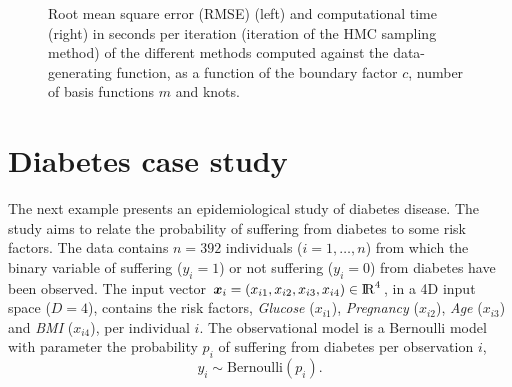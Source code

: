\documentclass[onecolumn,a4paper,11pt]{article}
\begin{document}
\begin{figure}
\caption{Root mean square error (RMSE) (left) and computational time (right) in seconds per iteration (iteration of the HMC sampling method) of the different methods computed against the data-generating function, as a function of the boundary factor $c$, number of basis functions $m$ and knots.}
  \label{ch5_fig17_RMSE_exII}
\end{figure}


\section{Diabetes case study}\label{ch5_sec_bf_caseV}
The next example presents an epidemiological study of diabetes disease. The study aims to relate the probability of suffering from diabetes to some risk factors. The data contains $n=392$ individuals ($i=1,\dots,n$) from which the binary variable of suffering ($y_i=1$) or not suffering ($y_i=0$) from diabetes have been observed. The input vector $\bm{x}_i=(x_{i1},x_{i2},x_{i3},x_{i4}) \in {\rm I\!R}^{4}$, in a 4D input space ($D=4$), contains the risk factors, \textit{Glucose} ($x_{i1}$), \textit{Pregnancy} ($x_{i2}$), \textit{Age} ($x_{i3}$) and \textit{BMI} ($x_{i4}$), per individual $i$. The observational model is a Bernoulli model with parameter the probability $p_i$ of suffering from diabetes per observation $i$,
%
\begin{equation*}
y_i \sim \mathrm{Bernoulli}(p_i).
\end{equation*}
\end{document}
